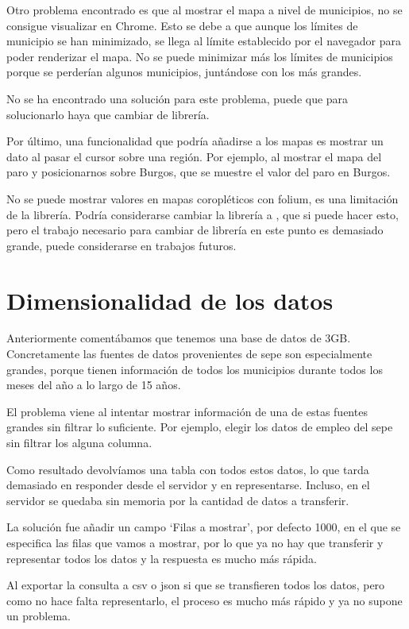 Otro problema encontrado es que al mostrar el mapa a nivel de municipios, no se consigue visualizar en Chrome. Esto se debe a que aunque los límites de municipio se han minimizado, se llega al límite establecido por el navegador para poder renderizar el mapa. No se puede minimizar más los límites de municipios porque se perderían algunos municipios, juntándose con los más grandes.

No se ha encontrado una solución para este problema, puede que para solucionarlo haya que cambiar de librería.

Por último, una funcionalidad que podría añadirse a los mapas es mostrar un dato al pasar el cursor sobre una región. Por ejemplo, al mostrar el mapa del paro y posicionarnos sobre Burgos, que se muestre el valor del paro en Burgos.

No se puede mostrar valores en mapas coropléticos con folium, es una limitación de la librería. Podría considerarse cambiar la librería a , que si puede hacer esto, pero el trabajo necesario para cambiar de librería en este punto es demasiado grande, puede considerarse en trabajos futuros.

\section{Dimensionalidad de los datos}

Anteriormente comentábamos que tenemos una base de datos de 3GB. Concretamente las fuentes de datos provenientes de sepe son especialmente grandes, porque tienen información de todos los municipios durante todos los meses del año a lo largo de 15 años.

El problema viene al intentar mostrar información de una de estas fuentes grandes sin filtrar lo suficiente. Por ejemplo, elegir los datos de empleo del sepe sin filtrar los alguna columna.

Como resultado devolvíamos una tabla con todos estos datos, lo que tarda demasiado en responder desde el servidor y en representarse. Incluso, en el servidor se quedaba sin memoria por la cantidad de datos a transferir.

La solución fue añadir un campo `Filas a mostrar', por defecto 1000, en el que se especifica las filas que vamos a mostrar, por lo que ya no hay que transferir y representar todos los datos y la respuesta es mucho más rápida.

Al exportar la consulta a csv o json si que se transfieren todos los datos, pero como no hace falta representarlo, el proceso es mucho más rápido y ya no supone un problema.


